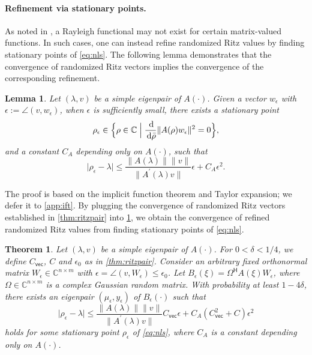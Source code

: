 \documentclass[a4paper,11pt]{article}
\newtheorem{theorem}{Theorem}
\newtheorem{lemma}{Lemma}
\newcommand{\Htran}{\mathsf{H}}
\newcommand{\de}{\,\mathrm{d}}
\newcommand{\defi}{:=}
\newcommand{\C}{\mathbb{C}}
\newcommand{\Crvec}{C_{\mathsf{vec}}}
\providecommand{\abs}[1]{\lvert#1\rvert}
\providecommand{\norm}[1]{\lVert#1\rVert}
\begin{document}
\paragraph{Refinement via stationary points.}
As noted in , a Rayleigh functional may not exist for certain matrix-valued functions. In such cases, one can instead refine randomized Ritz values by finding stationary points of \cref{eq:nls}. The following lemma demonstrates that the convergence of randomized Ritz vectors implies the convergence of the corresponding refinement.


\begin{lemma}
    \label{lem:ift}
    Let $(\lambda,v)$ be a simple eigenpair of $A(\cdot)$. Given a vector $w_{\epsilon}$ with $\epsilon\defi\angle(v,w_{\epsilon})$, when $\epsilon$ is sufficiently small, there exists a stationary point 
    \begin{equation*}
        \rho_{\epsilon}\in \Bigl\{ \rho\in\C \Bigm\vert \frac{\de }{\de \bar{\rho}} \norm{A(\rho)w_{\epsilon}}^{2} = 0  \Bigr\},
    \end{equation*}
    and a constant $C_{A}$ depending only on $A(\cdot)$, such that 
    \begin{equation*}
        \abs{\rho_{\epsilon}-\lambda} \leq  \frac{\norm{A(\lambda)}\norm{v}}{\norm{A^{\prime}(\lambda)v}}\epsilon+C_{A}\epsilon^{2}.
    \end{equation*}
\end{lemma}

The proof is based on the implicit function theorem and Taylor expansion; we defer it to \cref{app:ift}. By plugging the convergence of randomized Ritz vectors established in \cref{thm:ritzpair} into \cref{lem:ift}, we obtain the convergence of refined randomized Ritz values from finding stationary points of \cref{eq:nls}.



\begin{theorem}
    \label{thm:nls}
    Let $(\lambda,v)$ be a simple eigenpair of $A(\cdot)$.
    For $0<\delta<1/4$, we define $\Crvec$, $C$ and $\epsilon_{0}$ as in \cref{thm:ritzpair}. 
    Consider an arbitrary fixed orthonormal matrix $W_{\epsilon}\in\C^{n\times m}$ with $\epsilon=\angle(v,W_{\epsilon})\leq \epsilon_{0}$.
    Let $B_{\epsilon}(\xi)=\Omega^{\Htran}A(\xi)W_{\epsilon}$, where $\Omega\in\C^{n\times m}$ is a complex Gaussian random matrix. With probability at least $1-4\delta$, there exists an eigenpair $(\mu_{\epsilon},y_{\epsilon})$ of $B_{\epsilon}(\cdot)$ such that
    \begin{equation*}
        \abs{\rho_{\epsilon}-\lambda}\leq  
        \frac{\norm{A(\lambda)}\norm{v}}{\norm{A^{\prime}(\lambda)v}}
        \Crvec \epsilon+C_{A}(\Crvec^{2}+C)\epsilon^{2}
    \end{equation*}
    holds for some stationary point $\rho_{\epsilon}$ of \cref{eq:nls}, where $C_{A}$ is a constant depending only on $A(\cdot)$.
\end{theorem}
\end{document}
